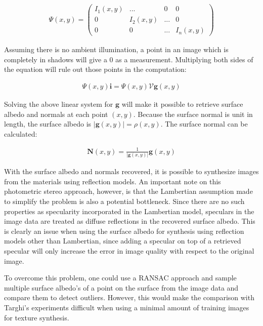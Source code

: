 	\begin{eqnarray*}
		\Psi(x,y) = \begin{pmatrix} I_1(x,y) & ... & 0 & 0\\ 
									0 & I_2(x,y) & ... & 0\\ 
									0 & 0 & ... & I_n(x,y) \end{pmatrix}
	\end{eqnarray*}

\noindent Assuming there is no ambient illumination, a point in an image which is completely in shadows will give a 0 as a measurement. Multiplying both sides of the equation will rule out those points in the computation:

	\begin{eqnarray*}
		\Psi(x,y)\textbf{i} = \Psi(x,y)\mathcal{V}\textbf{g}(x,y)
	\end{eqnarray*}

\noindent Solving the above linear system for $\textbf{g}$ will make it possible to retrieve surface albedo and normals at each point $(x,y)$. Because the surface normal is unit in length, the surface albedo is $|\textbf{g}(x,y)| = \rho(x,y)$. The surface normal can be calculated:

	\begin{eqnarray*}
		\textbf{N}(x,y) = \frac{1}{|\textbf{g}(x,y)|}\textbf{g}(x,y)
	\end{eqnarray*}

\noindent With the surface albedo and normals recovered, it is possible to synthesize images from the materials using reflection models. An important note on this photometric stereo approach, however, is that the Lambertian assumption made to simplify the problem is also a potential bottleneck. Since there are no such properties as specularity incorporated in the Lambertian model, speculars in the image data are treated as diffuse reflections in the recovered surface albedo. This is clearly an issue when using the surface albedo for synthesis using reflection models other than Lambertian, since adding a specular on top of a retrieved specular will only increase the error in image quality with respect to the original image.

To overcome this problem, one could use a RANSAC approach and sample multiple surface albedo's of a point on the surface from the image data and compare them to detect outliers. However, this would make the comparison with Targhi's experiments difficult when using a minimal amount of training images for texture synthesis.

